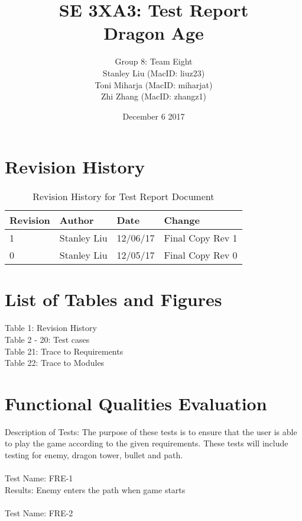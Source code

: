 \documentclass[12,english]{article}
\title{SE 3XA3: Test Report\\
        Dragon Age}
\author{Group 8: Team Eight \\
                 Stanley Liu (MacID: liuz23) \\    
                 Toni Miharja (MacID: miharjat)\\
                 Zhi Zhang (MacID: zhangz1)}
\date{December 6 2017 }
\begin{document}
\maketitle
\newpage
\tableofcontents
\newpage

\section{Revision History}
\begin{table}[!htbp]

	\begin{tabular}[r]{|l|l|l|l|}
		\hline		
		\textbf{Revision} & \textbf{Author} & \textbf{Date} & \textbf{Change}\\ 
		\hline
		1 & Stanley Liu & 12/06/17 & Final Copy Rev 1 \\
		\hline
		0 & Stanley Liu & 12/05/17 & Final Copy Rev 0 \\
		\hline
	\end{tabular}
		\caption{Revision History for Test Report Document}
		\label{Table}
\end{table}


\section{List of Tables and Figures}
Table 1: Revision History\\
Table 2 - 20: Test cases\\
Table 21: Trace to Requirements\\
Table 22: Trace to Modules\\

\section{Functional Qualities Evaluation}
Description of Tests: The purpose of these tests is to ensure that the user is able to play the game according to the given requirements. These tests will include testing for enemy, dragon tower, bullet and path. \\ \\
	
	Test Name: FRE-1 \\
	
	Results: Enemy enters the path when game starts \\ \\
	
	Test Name: FRE-2 \\
	
\end{document}
